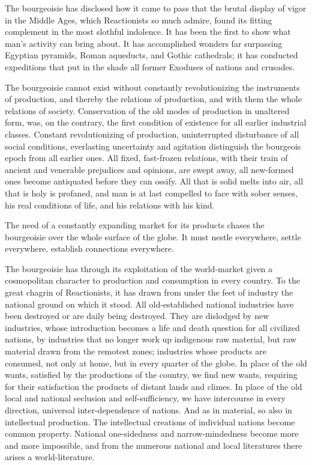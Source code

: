 The bourgeoisie has disclosed how it came to pass that the brutal display of vigor in the Middle Ages, which Reactionists so much admire, found its fitting complement in the most slothful indolence. It has been the first to show what man's activity can bring about. It has accomplished wonders far surpassing Egyptian pyramids, Roman aqueducts, and Gothic cathedrals; it has conducted expeditions that put in the shade all former Exoduses of nations and crusades.

The bourgeoisie cannot exist without constantly revolutionizing the instruments of production, and thereby the relations of production, and with them the whole relations of society. Conservation of the old modes of production in unaltered form, was, on the contrary, the first condition of existence for all earlier industrial classes. Constant revolutionizing of production, uninterrupted disturbance of all social conditions, everlasting uncertainty and agitation distinguish the bourgeois epoch from all earlier ones. All fixed, fast-frozen relations, with their train of ancient and venerable prejudices and opinions, are swept away, all new-formed ones become antiquated before they can ossify. All that is solid melts into air, all that is holy is profaned, and man is at last compelled to face with sober senses, his real conditions of life, and his relations with his kind.

The need of a constantly expanding market for its products chases the bourgeoisie over the whole surface of the globe. It must nestle everywhere, settle everywhere, establish connections everywhere.

The bourgeoisie has through its exploitation of the world-market given a cosmopolitan character to production and consumption in every country. To the great chagrin of Reactionists, it has drawn from under the feet of industry the national ground on which it stood. All old-established national industries have been destroyed or are daily being destroyed. They are dislodged by new industries, whose introduction becomes a life and death question for all civilized nations, by industries that no longer work up indigenous raw material, but raw material drawn from the remotest zones; industries whose products are consumed, not only at home, but in every quarter of the globe. In place of the old wants, satisfied by the productions of the country, we find new wants, requiring for their satisfaction the products of distant lands and climes. In place of the old local and national seclusion and self-sufficiency, we have intercourse in every direction, universal inter-dependence of nations. And as in material, so also in intellectual production. The intellectual creations of individual nations become common property. National one-sidedness and narrow-mindedness become more and more impossible, and from the numerous national and local literatures there arises a world-literature.

